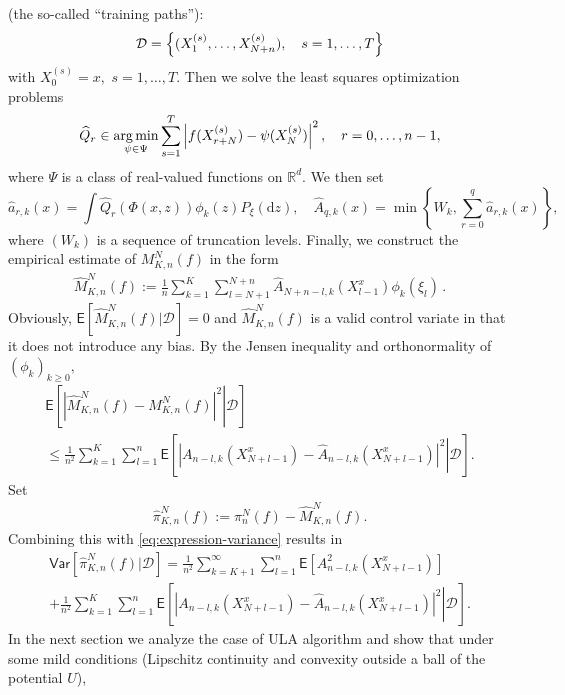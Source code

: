 \documentclass[bj]{imsart}
\def\PE{\mathsf{E}}
\def\PVar{\mathsf{Var}}
\def\rmd{\mathrm{d}}
\def\NtrainPath{T}
\def\TrainSet{\mathcal{D}}
\newcommand*{\argmin}{\operatornamewithlimits{arg\,min}}
\begin{document}
(the so-called ``training paths''):
\[
\TrainSet=\Bigl\{(X^{(s)}_{1},\ldots,X^{(s)}_{N+n}),\quad s=1,\ldots,\NtrainPath\Bigr\}
\]
with $X^{(s)}_{0}=x,$ $s=1,\ldots,T.$
Then we solve  the least squares optimization problems
\begin{equation}\label{eq:06042018a1}
\widehat{Q}_{r} \in \argmin_{\psi \in \Psi} \sum_{s = 1}^{T} \left|   f(X_{r+N}^{(s)}) - \psi(X^{(s)}_{N})\right|^2, \quad r=0,\ldots,n-1,
\end{equation}
where \(\Psi\) is a  class of  real-valued functions on \(\mathbb{R}^d\).
We then set
\begin{equation}
\label{eq:definition-hat-a-A}
\widehat{a}_{r,k}(x)= \int \widehat{Q}_r(\Phi(x,z)) \phi_k(z) P_\xi(\rmd z),
\quad
\widehat{A}_{q,k}(x) = \min\left\{W_k,\sum_{r=0}^q \widehat{a}_{r,k}(x)\right\},
\end{equation}
where $(W_k)$ is a sequence of truncation levels. Finally, we  construct the empirical estimate  of \(M_{K,n}^N(f)\) in the form
\begin{eqnarray*}
\widehat M_{K,n}^N(f) := \frac{1}{n}\sum_{k=1}^{K}\sum_{l=N+1}^{N+n} \widehat{A}_{N+n-l,k}(X_{l-1}^{x})\phi_{k}(\xi_{l})\,.
\end{eqnarray*}
Obviously, \(\mathsf{E}[\widehat M_{K,n}^N(f)|\TrainSet]=0\) and \(\widehat M_{K,n}^N(f)\) is a valid control variate in that it
does not introduce any bias. By the Jensen inequality and orthonormality of \((\phi_k)_{k\geq 0},\)
\begin{multline*}
\mathsf{E}\left[\left.\left|\widehat{M}_{K,n}^{N}(f)-M_{K,n}^{N}(f)\right|^{2}\right | \TrainSet \right]
\\
\leq \frac{1}{n^2}\sum_{k=1}^{K}\sum_{l=1}^{n}\PE\left[\left.|A_{n-l,k}(X^x_{N+l-1})-\widehat A_{n-l,k}(X^x_{N+l-1})|^2\right | \TrainSet \right].
\end{multline*}
Set
\begin{eqnarray*}
\widehat\pi_{K,n}^N(f):=\pi_n^N(f)-\widehat{M}_{K,n}^N(f).
\end{eqnarray*}
Combining this with \eqref{eq:expression-variance} results in
\begin{multline}
\label{eq:PVarA}
\PVar[\widehat \pi_{K,n}^N(f)|\TrainSet]=\frac{1}{n^2}\sum_{k=K+1}^{\infty}\sum_{l=1}^{n}\PE[A^2_{n-l,k}(X^x_{N+l-1})]
\\
+\frac{1}{n^2}\sum_{k=1}^{K}\sum_{l=1}^{n}\PE\left[\left.|A_{n-l,k}(X^x_{N+l-1})-\widehat A_{n-l,k}(X^x_{N+l-1})|^2\right | \TrainSet \right].
\end{multline}
In the next section we analyze the case of ULA algorithm and show that under some  mild conditions (Lipschitz continuity and convexity outside a ball of the potential $U$),
\end{document}
